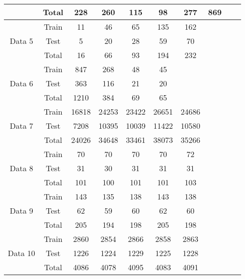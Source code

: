 \begin{table}[H]
{\begin{tabular}{cccccccccc}
                         & Total & 228   & 260   & 115   & 98    & 277   & 869  &      &      \\ \hline
\multirow{3}{*}{Data 5}  & Train & 11    & 46    & 65    & 135   & 162   &      & 	   & 	 \\
                         & Test  & 5     & 20    & 28    & 59  	 & 70    &      &      &   \\
                         & Total & 16    & 66    & 93    & 194   & 232   &      &      &  \\ \hline
\multirow{3}{*}{Data 6}  & Train & 847   & 268   & 48    & 45    &       &      &      &      \\
                         & Test  & 363   & 116   & 21    & 20    &       &      &      &      \\
                         & Total & 1210  & 384   & 69    & 65    &       &      &      &      \\ \hline
\multirow{3}{*}{Data 7}  & Train & 16818 & 24253 & 23422 & 26651 & 24686 &      &      &      \\
                         & Test  & 7208  & 10395 & 10039 & 11422 & 10580 &      &      &      \\
                         & Total & 24026 & 34648 & 33461 & 38073 & 35266 &      &      &      \\ \hline
\multirow{3}{*}{Data 8}  & Train & 70    & 70    & 70    & 70    & 72    &      &      &      \\
                         & Test  & 31    & 30    & 31    & 31    & 31    &      &      &      \\
                         & Total & 101   & 100   & 101   & 101   & 103   &      &      &      \\ \hline
\multirow{3}{*}{Data 9}  & Train & 143   & 135   & 138   & 143   & 138   &      &      &      \\
                         & Test  & 62    & 59    & 60    & 62    & 60    &      &      &      \\
                         & Total & 205   & 194   & 198   & 205   & 198   &      &      &      \\ \hline
\multirow{3}{*}{Data 10} & Train & 2860  & 2854  & 2866  & 2858  & 2863  &      &      &      \\
                         & Test  & 1226  & 1224  & 1229  & 1225  & 1228  &      &      &      \\
                         & Total & 4086  & 4078  & 4095  & 4083  & 4091  &      &      &      \\ \hline

\end{tabular}}
\end{table}
